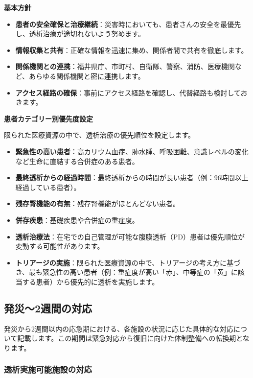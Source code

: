 \documentclass[
  japanese,
  letterpaper,
  DIV=11,
  numbers=noendperiod]{scrartcl}
\providecommand{\tightlist}{%
  \setlength{\itemsep}{0pt}\setlength{\parskip}{0pt}}
\begin{document}
\textbf{基本方針}

\begin{itemize}
\tightlist
\item
  \textbf{患者の安全確保と治療継続}：災害時においても、患者さんの安全を最優先し、透析治療が途切れないよう努めます。
\item
  \textbf{情報収集と共有}：正確な情報を迅速に集め、関係者間で共有を徹底します。
\item
  \textbf{関係機関との連携}：福井県庁、市町村、自衛隊、警察、消防、医療機関など、あらゆる関係機関と密に連携します。
\item
  \textbf{アクセス経路の確保}：事前にアクセス経路を確認し、代替経路も検討しておきます。
\end{itemize}

\textbf{患者カテゴリー別優先度設定}

限られた医療資源の中で、透析治療の優先順位を設定します。

\begin{itemize}
\tightlist
\item
  \textbf{緊急性の高い患者}：高カリウム血症、肺水腫、呼吸困難、意識レベルの変化など生命に直結する合併症のある患者。
\item
  \textbf{最終透析からの経過時間}：最終透析からの時間が長い患者（例：96時間以上経過している患者）。
\item
  \textbf{残存腎機能の有無}：残存腎機能がほとんどない患者。
\item
  \textbf{併存疾患}：基礎疾患や合併症の重症度。
\item
  \textbf{透析治療法}：在宅での自己管理が可能な腹膜透析（PD）患者は優先順位が変動する可能性があります。
\item
  \textbf{トリアージの実施}：限られた医療資源の中で、トリアージの考え方に基づき、最も緊急性の高い患者（例：重症度が高い「赤」、中等症の「黄」に該当する患者）から優先的に透析を実施します。
\end{itemize}

\subsection{発災〜2週間の対応}\label{ux767aux707d2ux9031ux9593ux306eux5bfeux5fdc}

発災から2週間以内の応急期における、各施設の状況に応じた具体的な対応について記載します。この期間は緊急対応から復旧に向けた体制整備への転換期となります。

\subsubsection{透析実施可能施設の対応}\label{ux900fux6790ux5b9fux65bdux53efux80fdux65bdux8a2dux306eux5bfeux5fdc}
\end{document}
